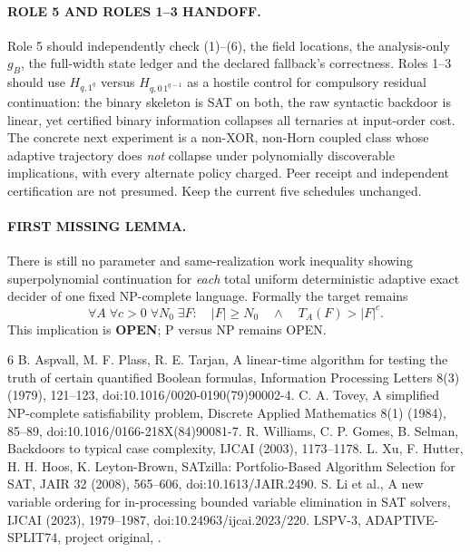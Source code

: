 \documentclass[11pt]{article}
\begin{document}
\paragraph{ROLE 5 AND ROLES 1--3 HANDOFF.}
Role 5 should independently check (1)--(6), the field locations,
the analysis-only $g_B$, the full-width state ledger and the
declared fallback's correctness. Roles 1--3 should use
$H_{q,1^q}$ versus $H_{q,0\,1^{q-1}}$ as a
hostile control for compulsory residual continuation:
the binary skeleton is SAT on both, the raw syntactic backdoor
is linear, yet certified binary information collapses all
ternaries at input-order cost. The concrete next experiment is
a non-XOR, non-Horn coupled class whose adaptive trajectory
does \emph{not} collapse under polynomially discoverable
implications, with every alternate policy charged.
Peer receipt and independent certification are not presumed.
Keep the current five schedules unchanged.

\paragraph{FIRST MISSING LEMMA.}
There is still no parameter and same-realization work inequality
showing superpolynomial continuation for \emph{each} total
uniform deterministic adaptive exact decider of one fixed
NP-complete language. Formally the target remains
\[
\forall A\;\forall c>0\;\forall N_0\;
\exists F:\quad |F|\ge N_0
\quad\land\quad T_A(F)>|F|^c.
\]
This implication is \textbf{OPEN}; P versus NP remains OPEN.

\begin{thebibliography}{6}
B. Aspvall, M. F. Plass, R. E. Tarjan,
A linear-time algorithm for testing the truth of certain
quantified Boolean formulas, Information Processing Letters
8(3) (1979), 121--123, doi:10.1016/0020-0190(79)90002-4.
C. A. Tovey, A simplified NP-complete satisfiability problem,
Discrete Applied Mathematics 8(1) (1984), 85--89,
doi:10.1016/0166-218X(84)90081-7.
R. Williams, C. P. Gomes, B. Selman,
Backdoors to typical case complexity, IJCAI (2003), 1173--1178.
L. Xu, F. Hutter, H. H. Hoos, K. Leyton-Brown,
SATzilla: Portfolio-Based Algorithm Selection for SAT,
JAIR 32 (2008), 565--606, doi:10.1613/JAIR.2490.
S. Li et al.,
A new variable ordering for in-processing bounded
variable elimination in SAT solvers, IJCAI (2023),
1979--1987, doi:10.24963/ijcai.2023/220.
LSPV-3, ADAPTIVE-SPLIT74, project original,
.
\end{thebibliography}
\end{document}
